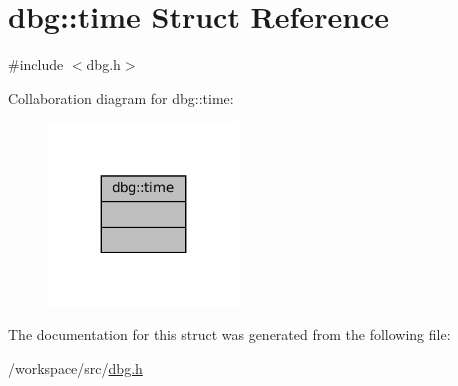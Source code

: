 \hypertarget{structdbg_1_1time}{}\section{dbg\+:\+:time Struct Reference}
\label{structdbg_1_1time}


{\ttfamily \#include $<$dbg.\+h$>$}



Collaboration diagram for dbg\+:\+:time\+:
\nopagebreak
\begin{figure}[H]
\begin{center}
\leavevmode
\includegraphics[width=143pt]{structdbg_1_1time__coll__graph}
\end{center}
\end{figure}


The documentation for this struct was generated from the following file\+:\begin{DoxyCompactItemize}
\item 
/workspace/src/\hyperlink{dbg_8h}{dbg.\+h}\end{DoxyCompactItemize}
